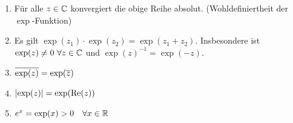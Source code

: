 \begin{satz}
    \theoremescape
    \begin{enumerate}[label=(\alph*)]
        \item Für alle $z\in\mathbb{C}$ konvergiert die obige Reihe absolut. (Wohldefiniertheit der $\exp$-Funktion)
        \item Es gilt $\exp(z_1)\cdot\exp(z_2) = \exp(z_1+z_2)$. Insbesondere ist $\exp(z)\neq 0~\forall z\in\mathbb{C}$ und $\exp(z)^{-1} = \exp(-z)$.
        \item $\overline{\exp(z)} = \exp(\overline{z})$
        \item $\left\lvert\exp(z)\right\rvert = \exp(\operatorname{Re}(z))$
        \item $e^x = \exp(x) > 0\quad\forall x\in\mathbb{R}$
    \end{enumerate}


\end{satz}
